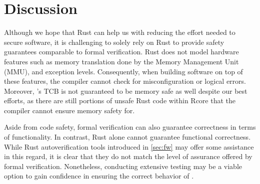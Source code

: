 
\chapter{Discussion}
\label{sec:discussion}

Although we hope that Rust can help us with reducing the effort needed to secure
software, it is challenging to solely rely on Rust to provide safety guarantees
comparable to formal verification. Rust does not model hardware features
such as memory translation done by the Memory Management Unit (MMU), and
exception levels. Consequently, when building software on top of these features,
the compiler cannot check for misconfiguration or logical errors.
Moreover, \rustsec{}'s TCB \rustcore{} is not guaranteed to be memory safe as
well despite our best efforts, as there are still portions of unsafe Rust code
within Rcore that the compiler cannot ensure memory safety for.

Aside from code safety, formal verification can also guarantee correctness in
terms of functionality.
In contrast, Rust alone cannot guarantee functional correctness. While Rust
autoverification tools introduced in \autoref{sec:fw} may offer some assistance
in this regard, it is clear that they do not match the level of assurance
offered by formal verification.
Nonetheless, conducting extensive testing may be a viable option to gain
confidence in ensuring the correct behavior of \rustcore{}.
